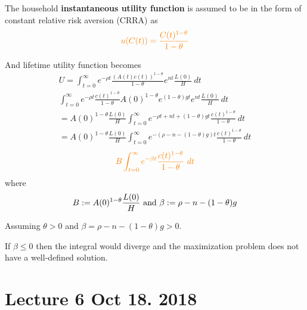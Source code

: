 \documentclass[]{article}
\begin{document}
	\begin{assumption}
		The household \textbf{instantaneous utility function} is assumed to be in the form of constant relative risk aversion (CRRA) as 
		\begin{equation}
		\textcolor{orange}{
			u(C(t)) = \frac{C(t)^{1 - \theta}}{1 - \theta}
			}
		\end{equation}
	\end{assumption}
	And lifetime utility function becomes
	\begin{gather*}
		U = \int_{t=0}^\infty e^{-\rho t} \frac{(A(t)c(t))^{1-\theta}}{1-\theta} e^{nt} \frac{L(0)}{H}\ dt\\
		\int_{t=0}^\infty e^{-\rho t} \frac{c(t)^{1-\theta}}{1-\theta} A(0)^{1-\theta} e^{(1-\theta)gt} e^{nt} \frac{L(0)}{H}\ dt\\
		= A(0)^{1 - \theta} \frac{L(0)}{H} \int_{t=0}^\infty {e^{-\rho t + nt + (1-\theta)gt} \frac{c(t)^{1-\theta}}{1-\theta}\ dt} \\
		= A(0)^{1 - \theta} \frac{L(0)}{H} \int_{t=0}^\infty {e^{-(\rho - n - (1-\theta)g)t} \frac{c(t)^{1-\theta}}{1-\theta}\ dt}
	\end{gather*}
	\begin{equation}
	\textcolor{orange}{
		B \int_{t=0}^\infty e^{-\beta t}\frac{c(t)^{1-\theta}}{1- \theta}\ dt
	}
	\end{equation}
	where
	\begin{equation}
		B := A(0)^{1-\theta} \frac{L(0)}{H}\text{{ and }} \beta := \rho - n - (1-\theta)g
	\end{equation}
	\begin{assumption}
		Assuming $\theta > 0$ and $\beta = \rho - n - (1-\theta)g > 0$.
	\end{assumption}
	
	\begin{remark}
		If $\beta \leq 0$ then the integral would diverge and the maximization problem does not have a well-defined solution.
	\end{remark}
	
	\section{Lecture 6 Oct 18. 2018}
\end{document}
